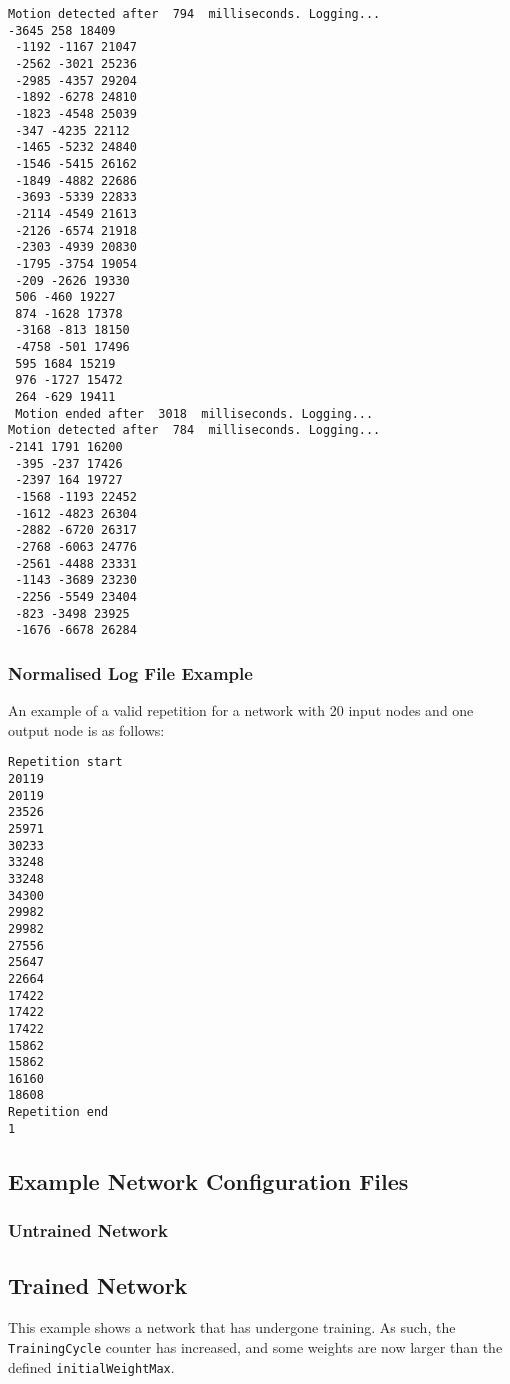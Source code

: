 \documentclass[a4paper]{article}
\begin{document}
\begin{lstlisting}
Motion detected after  794  milliseconds. Logging...
-3645 258 18409
 -1192 -1167 21047
 -2562 -3021 25236
 -2985 -4357 29204
 -1892 -6278 24810
 -1823 -4548 25039
 -347 -4235 22112
 -1465 -5232 24840
 -1546 -5415 26162
 -1849 -4882 22686
 -3693 -5339 22833
 -2114 -4549 21613
 -2126 -6574 21918
 -2303 -4939 20830
 -1795 -3754 19054
 -209 -2626 19330
 506 -460 19227
 874 -1628 17378
 -3168 -813 18150
 -4758 -501 17496
 595 1684 15219
 976 -1727 15472
 264 -629 19411
 Motion ended after  3018  milliseconds. Logging...
Motion detected after  784  milliseconds. Logging...
-2141 1791 16200
 -395 -237 17426
 -2397 164 19727
 -1568 -1193 22452
 -1612 -4823 26304
 -2882 -6720 26317
 -2768 -6063 24776
 -2561 -4488 23331
 -1143 -3689 23230
 -2256 -5549 23404
 -823 -3498 23925
 -1676 -6678 26284
\end{lstlisting}

\subsubsection{Normalised Log File Example}

An example of a valid repetition for a network with 20 input nodes and one output node is as follows:

\begin{lstlisting}
Repetition start
20119
20119
23526
25971
30233
33248
33248
34300
29982
29982
27556
25647
22664
17422
17422
17422
15862
15862
16160
18608
Repetition end
1
\end{lstlisting}

\subsection{Example Network Configuration Files}%

\subsubsection{Untrained Network}


\subsection{Trained Network}

This example shows a network that has undergone training. As such, the \lstinline{TrainingCycle} counter has increased, and some weights are now larger than the defined \lstinline{initialWeightMax}.
\end{document}
